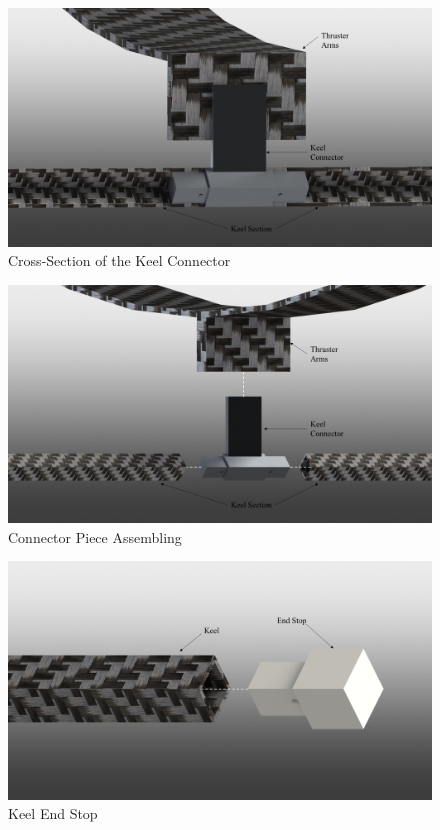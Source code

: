 \documentclass[../main.tex]{subfiles}
\begin{document}
\begin{figure}[H]
	\centering
	\includegraphics[width=.9\linewidth]{img/design/keel/thrusterArmConnectorCrossSection.png}
	\caption{Cross-Section of the Keel Connector}
	\label{fig:thrusterArmConnectorCrossSection}
\end{figure}
\begin{figure}[H]
	\centering
	\includegraphics[width=.9\linewidth]{img/design/keel/thrusterArmConnectorPiece.png}
	\caption{Connector Piece Assembling}
	\label{fig:fig:thrusterArmConnectorPiece}
\end{figure}
\begin{figure}[H]
	\centering
	\includegraphics[width=.8\linewidth]{img/design/keel/keelEndCap.png}
	\caption{Keel End Stop}
	\label{fig:keelEndCap}
\end{figure}
\end{document}
